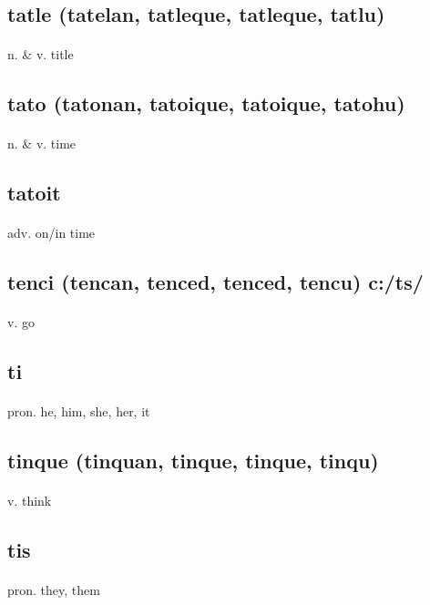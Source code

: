 \documentclass[UTF8]{article}
\begin{document}
    \subsection{tatle (tatelan, tatleque, tatleque, tatlu)}
    \paragraph{} n. \& v. title 
    \subsection{tato (tatonan, tatoique, tatoique, tatohu)}
    \paragraph{} n. \& v. time 
    \subsection{tatoit}
    \paragraph{} adv. on/in time 
    \subsection{tenci (tencan, tenced, tenced, tencu) c:/ts/}
    \paragraph{} v. go 
    \subsection{ti}
    \paragraph{} pron. he, him, she, her, it 
    \subsection{tinque (tinquan, tinque, tinque, tinqu)}
    \paragraph{} v. think
    \subsection{tis}
    \paragraph{} pron. they, them 
\end{document}
